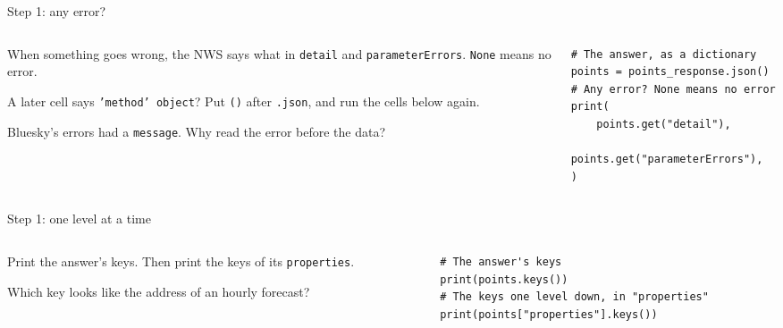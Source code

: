 \documentclass[9pt,aspectratio=169]{beamer}
\begin{document}
\begin{frame}[fragile]{Step 1: any error?}
    \begin{columns}[T]
        \begin{column}{0.37\textwidth}
            When something goes wrong, the NWS says what in \texttt{detail} and \texttt{parameterErrors}. \texttt{None} means no error.

            \medskip
            A later cell says \texttt{'method' object}? Put \texttt{()} after \texttt{.json}, and run the cells below again.

            \medskip
            Bluesky's errors had a \texttt{message}. Why read the error before the data?
        \end{column}
        \begin{column}{0.6\textwidth}
\begin{lstlisting}
# The answer, as a dictionary
points = points_response.json()
# Any error? None means no error
print(
    points.get("detail"),
    points.get("parameterErrors"),
)
\end{lstlisting}
        \end{column}
    \end{columns}
\end{frame}

\begin{frame}[fragile]{Step 1: one level at a time}
    \begin{columns}[T]
        \begin{column}{0.37\textwidth}
            Print the answer's keys. Then print the keys of its \texttt{properties}.

            \medskip
            Which key looks like the address of an hourly forecast?
        \end{column}
        \begin{column}{0.6\textwidth}
\begin{lstlisting}
# The answer's keys
print(points.keys())
# The keys one level down, in "properties"
print(points["properties"].keys())
\end{lstlisting}
        \end{column}
    \end{columns}
\end{frame}
\end{document}
